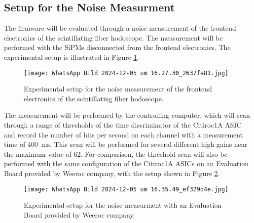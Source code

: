 \subsection{Setup for the Noise Measurment}
The firmware will be evaluated through a noise measurement of the frontend electronics of the scintillating fiber hodoscope. 
The measurement will be performed with the SiPMs disconnected from the frontend electronics. 
The experimental setup is illustrated in Figure \ref{fig:noise_setup}.
\begin{figure}[H]
    \centering
    \texttt{[image: WhatsApp Bild 2024-12-05 um 16.27.30\_2637fa81.jpg]}%
    \caption{Experimental setup for the noise measurement of the frontend electronics of the scintillating fiber hodoscope.}
    \label{fig:noise_setup}
\end{figure}
The measurement will be performed by the controlling computer, 
which will scan through a range of thresholds of the time discriminator of the Citiroc1A ASIC and record the number of hits per second on each channel with a measurement time of \SI{400}{\milli\second}.
This scan will be performed for several different high gains near the maximum value of 62.
\newline
For comparison, the threshold scan will also be performed with the same configuration of the Citiroc1A ASICs on an Evaluation Board provided by Weeroc company, 
with the setup shown in Figure \ref{fig:noise_setup_testboard}.
\begin{figure}[H]
    \centering
    \texttt{[image: WhatsApp Bild 2024-12-05 um 16.35.49\_ef329d4e.jpg]}%
    \caption{Experimental setup for the noise measurment with an Evaluation Board provided by Weeroc company.}
    \label{fig:noise_setup_testboard}
\end{figure}

